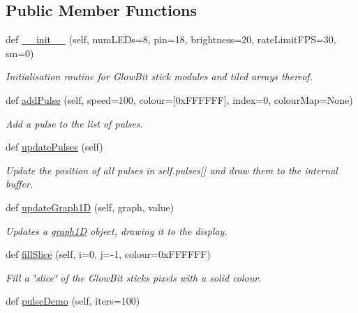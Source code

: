 \subsection*{Public Member Functions}
\begin{DoxyCompactItemize}
\item 
def \hyperlink{classglowbit_1_1stick_ac51b02c334481110558ac2f8c54938b8}{\+\_\+\+\_\+init\+\_\+\+\_\+} (self, num\+L\+E\+Ds=8, pin=18, brightness=20, rate\+Limit\+F\+PS=30, sm=0)
\begin{DoxyCompactList}\small\item\em Initialisation routine for Glow\+Bit stick modules and tiled arrays thereof. \end{DoxyCompactList}\item 
def \hyperlink{classglowbit_1_1stick_a14fb6c41aebc0b87595dde1ee4dd35a3}{add\+Pulse} (self, speed=100, colour=\mbox{[}0x\+F\+F\+F\+F\+F\+F\mbox{]}, index=0, colour\+Map=\+None)
\begin{DoxyCompactList}\small\item\em Add a pulse to the list of pulses. \end{DoxyCompactList}\item 
def \hyperlink{classglowbit_1_1stick_a84e72d81b9c96b1acb268b730866a8ea}{update\+Pulses} (self)
\begin{DoxyCompactList}\small\item\em Update the position of all pulses in self.\+pulses\mbox{[}\mbox{]} and draw them to the internal buffer. \end{DoxyCompactList}\item 
def \hyperlink{classglowbit_1_1stick_acde1622da63c602b209a608384cb6020}{update\+Graph1D} (self, graph, value)
\begin{DoxyCompactList}\small\item\em Updates a \hyperlink{classglowbit_1_1stick_1_1graph1D}{graph1D} object, drawing it to the display. \end{DoxyCompactList}\item 
def \hyperlink{classglowbit_1_1stick_a232b27f2f0e1c27787e6a584a05fc34c}{fill\+Slice} (self, i=0, j=-\/1, colour=0x\+F\+F\+F\+F\+F\+F)
\begin{DoxyCompactList}\small\item\em Fill a \char`\"{}slice\char`\"{} of the Glow\+Bit stick\textquotesingle{}s pixels with a solid colour. \end{DoxyCompactList}\item 
def \hyperlink{classglowbit_1_1stick_a1ea899a8e5ed6f4c24662853cb9a767d}{pulse\+Demo} (self, iters=100)

\end{DoxyCompactItemize}
